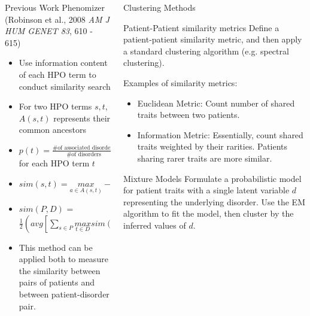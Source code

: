 \documentclass[final]{beamer} %
\begin{document}
\begin{frame}{}
\begin{columns}[T]
\begin{column}{0.3\linewidth}
   \begin{block}{\Large Previous Work}
     \Large Phenomizer (Robinson et al., 2008 {\it{\Large AM J HUM
         GENET 83}}, 610 - 615)
     \begin{itemize}
     \item Use information content of each HPO term to conduct
       similarity search
     \item For two HPO terms $s, t$, $A(s, t)$ represents their common
       ancestors
     \item $p(t) = \frac{\text{\# of associated disorders}}{\text{\#
           of disorders}}$ for each HPO term $t$
     \item $sim(s, t) = \underset{a \in A(s, t)}{max} -\log p(a)$
     \item $sim(P, D)$ = $\frac{1}{2} ( avg[\sum\limits_{s \in P}
       \underset{t \in D}{max} sim(s, t) ] + avg[\sum\limits_{t \in D}
       \underset{s \in P}{max} sim(t, s) ] ) $
     \item This method can be applied both to measure the similarity
       between pairs of patients and between patient-disorder pair.
     \end{itemize}
   \end{block}
 \end{column}

 \begin{column}{0.3\linewidth}
   \begin{block}{\Huge Clustering Methods}
     \Large
     \begin{block}{\Large Patient-Patient similarity metrics}
       Define a patient-patient similarity metric, and then apply a
       standard clustering algorithm (e.g. spectral clustering).

       Examples of similarity metrics:
       \begin{itemize}
       \item Euclidean Metric: Count number of shared traits between
         two patients.
       \item Information Metric: Essentially, count shared traits
         weighted by their rarities. Patients sharing rarer traits are
         more similar.
       \end{itemize}
     \end{block}
     \begin{block}{\Large Mixture Models}
       Formulate a probabilistic model for patient traits with a
       single latent variable $d$ representing the underlying
       disorder. Use the EM algorithm to fit the model, then cluster
       by the inferred values of $d$.


\end{block}
\end{block}
\end{column}
\end{columns}
\end{frame}
\end{document}
